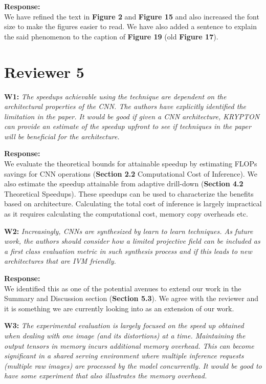 \documentclass[preprint]{vldb}
\begin{document}
\vspace{2mm}
\noindent \textbf{Response:}\\
We have refined the text in \textbf{Figure 2} and \textbf{Figure 15} and also increased the font size to make the figures easier to read. We have also added a sentence to explain the said phenomenon to the caption of \textbf{Figure 19} (old \textbf{Figure 17}).


\section{Reviewer 5}

\vspace{2mm}
\noindent \textbf{W1:} \textit{ The speedups achievable using the technique are dependent on the architectural properties of the CNN. The authors have explicitly identified the limitation in the paper. It would be good if given a CNN architecture, KRYPTON can provide an estimate of the speedup upfront to see if techniques in the paper will be beneficial for the architecture.}

\vspace{2mm}
\noindent \textbf{Response:}\\
We evaluate the theoretical bounds for attainable speedup by estimating FLOPs savings for CNN operations (\textbf{Section 2.2} Computational Cost of Inference).
We also estimate the speedup attainable from adaptive drill-down (\textbf{Section 4.2} Theoretical Speedups).
These speedups can be used to characterize the benefits based on architecture.
Calculating the total cost of inference is largely impractical as it requires calculating the computational cost, memory copy overheads etc.


\vspace{2mm}
\noindent \textbf{W2:} \textit{ Increasingly, CNNs are synthesized by learn to learn techniques. As future work, the authors should consider how a limited projective field can be included as a first class evaluation metric in such synthesis process and if this leads to new architectures that are IVM friendly.}

\vspace{2mm}
\noindent \textbf{Response:}\\
We identified this as one of the potential avenues to extend our work in the Summary and Discussion section (\textbf{Section 5.3}).
We agree with the reviewer and it is something we are currently looking into as an extension of our work.

\vspace{2mm}
\noindent \textbf{W3:} \textit{ The experimental evaluation is largely focused on the speed up obtained when dealing with one image (and its distortions) at a time. Maintaining the output tensors in memory incurs additional memory overhead. This can become significant in a shared serving environment where multiple inference requests (multiple raw images) are processed by the model concurrently. It would be good to have some experiment that also illustrates the memory overhead.}
\end{document}
